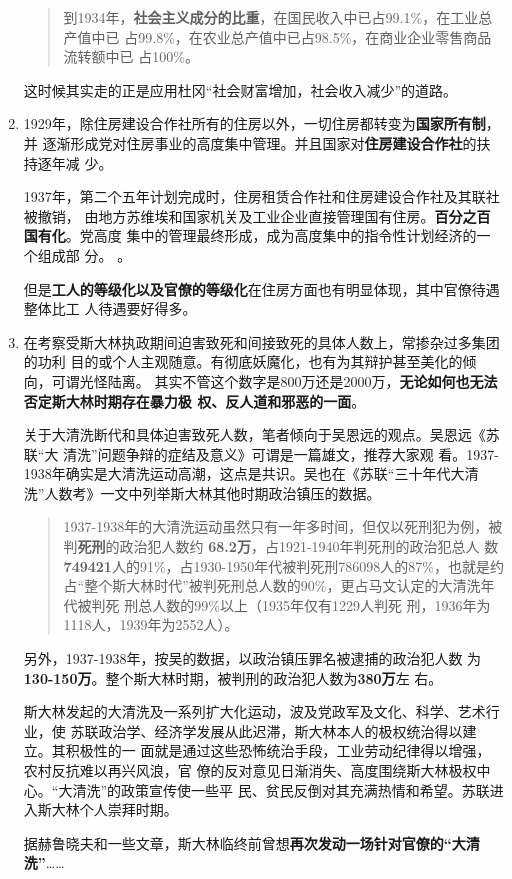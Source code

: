 \begin{enumerate}
\begin{quotation}
    到1934年，\textbf{社会主义成分的比重}，在国民收入中已占99.1\%，在工业总产值中已
    占99.8\%，在农业总产值中已占98.5\%，在商业企业零售商品流转额中已
    占100\%。\cite[5.4.2节]{huanglifunep}
  \end{quotation}

  这时候其实走的正是应用杜冈“社会财富增加，社会收入减少”的道路。

\item 1929年，除住房建设合作社所有的住房以外，一切住房都转变为\textbf{国家所有制}，并
  逐渐形成党对住房事业的高度集中管理。并且国家对\textbf{住房建设合作社}的扶持逐年减
  少。

  1937年，第二个五年计划完成时，住房租赁合作社和住房建设合作社及其联社被撤销，
  由地方苏维埃和国家机关及工业企业直接管理国有住房。\textbf{百分之百国有化}。党高度
  集中的管理最终形成，成为高度集中的指令性计划经济的一个组成部
  分。\cite[第7章末]{huanglifunep} 。

  但是\textbf{工人的等级化以及官僚的等级化}在住房方面也有明显体现，其中官僚待遇整体比工
  人待遇要好得多。

\item 在考察受斯大林执政期间迫害致死和间接致死的具体人数上，常掺杂过多集团的功利
  目的或个人主观随意。有彻底妖魔化，也有为其辩护甚至美化的倾向，可谓光怪陆离。
  其实不管这个数字是800万还是2000万，\textbf{无论如何也无法否定斯大林时期存在暴力极
    权、反人道和邪恶的一面}。

  关于大清洗断代和具体迫害致死人数，笔者倾向于吴恩远的观点。吴恩远《苏联“大
  清洗”问题争辩的症结及意义》\cite{wuenyuanzhengbian}可谓是一篇雄文，推荐大家观
  看。1937-1938年确实是大清洗运动高潮，这点是共识。吴也在《苏联“三十年代大清
  洗”人数考》一文中列举斯大林其他时期政治镇压的数据。
  \begin{quotation}
    1937-1938年的大清洗运动虽然只有一年多时间，但仅以死刑犯为例，被
    判\textbf{死刑}的政治犯人数约 \textbf{68.2万}，占1921-1940年判死刑的政治犯总人
    数\textbf{749421}人的91\%，占1930-1950年代被判死刑786098人的87\%，也就是约
    占“整个斯大林时代”被判死刑总人数的90\%，更占马文认定的大清洗年代被判死
    刑总人数的99\%以上（1935年仅有1229人判死
    刑，1936年为1118人，1939年为2552人）。
  \end{quotation}

  另外，1937-1938年，按吴的数据，以政治镇压罪名被逮捕的政治犯人数
  为\textbf{130-150万}。整个斯大林时期，被判刑的政治犯人数为\textbf{380万}左
  右。

  斯大林发起的大清洗及一系列扩大化运动，波及党政军及文化、科学、艺术行业，使
  苏联政治学、经济学发展从此迟滞，斯大林本人的极权统治得以建立。其积极性的一
  面就是通过这些恐怖统治手段，工业劳动纪律得以增强，农村反抗难以再兴风浪，官
  僚的反对意见日渐消失、高度围绕斯大林极权中心。“大清洗”的政策宣传使一些平
  民、贫民反倒对其充满热情和希望。苏联进入斯大林个人崇拜时期。

  据赫鲁晓夫和一些文章，斯大林临终前曾想\textbf{再次发动一场针对官僚的“大清
    洗”}……
\end{enumerate}

